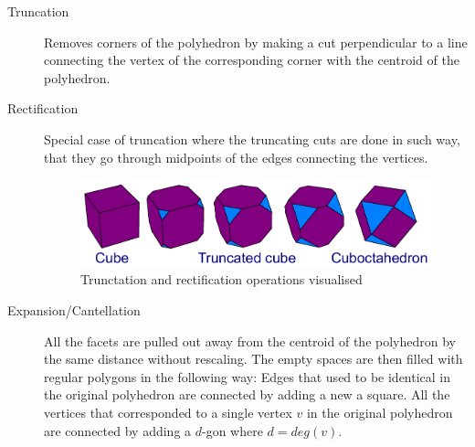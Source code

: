 \begin{description}
    \item[Truncation] Removes corners of the polyhedron by making a cut perpendicular to a line connecting the vertex of the corresponding corner with the centroid of the polyhedron.
    \item[Rectification] Special case of truncation where the truncating cuts are done in such way, that they go through midpoints of the edges connecting the vertices. 
    \begin{figure}[H]
        \centering
        \includegraphics[width=1\textwidth]{../Resources/Figs/op_truncation.pdf}
        \caption{Trunctation and rectification operations visualised \cite{wikimedia-cube-truncation}}
        \label{fig:op_truncation}
    \end{figure}
    \item[Expansion/Cantellation] All the facets are pulled out away from the centroid of the polyhedron by the same distance without rescaling. The empty spaces are then filled with regular polygons in the following way: Edges that used to be identical in the original polyhedron are connected by adding a new a square. All the vertices that corresponded to a single vertex $v$ in the original polyhedron are connected by adding a $d$-gon where $d=deg(v)$.


\end{description}
